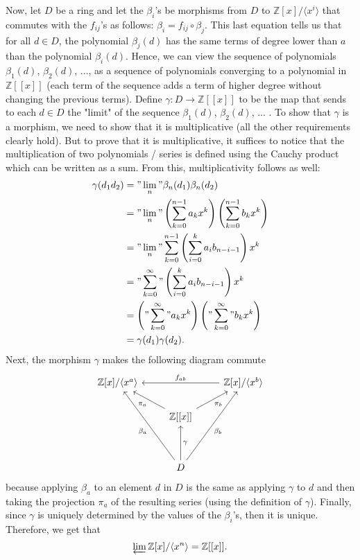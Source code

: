 \documentclass{article}
\newcommand{\Z}{\mathbb{Z}}
\begin{document}
\begin{enumerate}[label=(\alph*)]
    Now, let $D$ be a ring and let the $\beta_i$'s be morphisms from $D$ to $\Z[x]/\langle x^i \rangle$ that commutes with the $f_{ij}$'s as follows: $\beta_i = f_{ij} \circ \beta_j$. This last equation tells us that for all $d \in D$, the polynomial $\beta_j(d)$ has the same terms of degree lower than $a$ than the polynomial $\beta_i(d)$. Hence, we can view the sequence of polynomials $\beta_1(d)$, $\beta_2(d)$, ..., as a sequence of polynomials converging to a polynomial in $\Z[[x]]$ (each term of the sequence adds a term of higher degree without changing the previous terms). Define $\gamma : D \to \Z[[x]]$ to be the map that sends to each $d \in D$ the "limit" of the sequence $\beta_1(d)$, $\beta_2(d)$, ... . To show that $\gamma$ is a morphism, we need to show that it is multiplicative (all the other requirements clearly hold). But to prove that it is multiplicative, it suffices to notice that the multiplication of two polynomials / series is defined using the Cauchy product which can be written as a sum. From this, multiplicativity follows as well:
    \begin{align*}
        \gamma(d_1d_2) &= "\lim_n"\beta_n(d_1)\beta_n(d_2) \\
        &= "\lim_n"\left(\sum_{k=0}^{n-1}a_kx^k\right)\left(\sum_{k=0}^{n-1}b_kx^k\right) \\
        &= "\lim_n" \sum_{k=0}^{n-1}\left(\sum_{i=0}^{k}a_ib_{n-i-1}\right)x^k \\
        &= "\sum_{k=0}^{\infty}"\left(\sum_{i=0}^{k}a_ib_{n-i-1}\right)x^k \\
        &= \left("\sum_{k=0}^{\infty}"a_kx^k\right)\left("\sum_{k=0}^{\infty}"b_kx^k\right) \\
        &= \gamma(d_1)\gamma(d_2).
    \end{align*}
    Next, the morphism $\gamma$ makes the following diagram commute 
    \[\begin{tikzcd}
	{\Z[x]/\langle x^a \rangle} && {\Z[x]/\langle x^b \rangle} \\
	& {\Z[[x]]} \\
	\\
	& D
	\arrow["{f_{ab}}"', from=1-3, to=1-1]
	\arrow["{\pi_a}", from=2-2, to=1-1]
	\arrow["{\pi_b}"', from=2-2, to=1-3]
	\arrow["{\beta_a}", from=4-2, to=1-1]
	\arrow["{\beta_b}"', from=4-2, to=1-3]
	\arrow["\gamma"', from=4-2, to=2-2]
    \end{tikzcd}\]
    because applying $\beta_a$ to an element $d$ in $D$ is the same as applying $\gamma$ to $d$ and then taking the projection $\pi_a$ of the resulting series (using the definition of $\gamma$). Finally, since $\gamma$ is uniquely determined by the values of the $\beta_i$'s, then it is unique. Therefore, we get that
    $$\varprojlim\Z[x]/\langle x^n \rangle = \Z[[x]].$$ \\


\end{enumerate}
\end{document}
